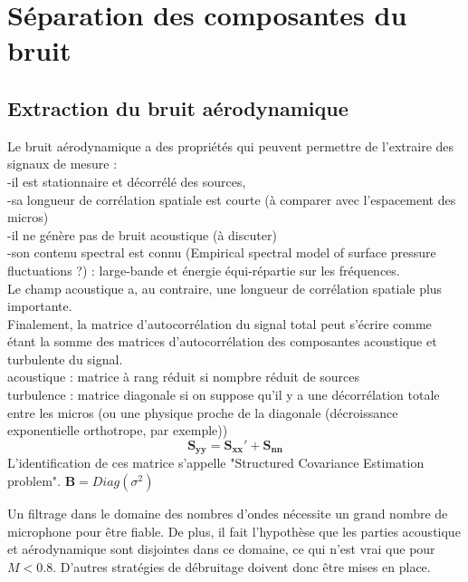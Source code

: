 \chapter{Séparation des composantes du bruit}

\section{Extraction du bruit aérodynamique}

Le bruit aérodynamique a des propriétés qui peuvent permettre de l'extraire des signaux de mesure : \\
-il est stationnaire et décorrélé des sources,\\
-sa longueur de corrélation spatiale est courte (à comparer avec l'espacement des micros) \\
-il ne génère pas de bruit acoustique (à discuter)\\
-son contenu spectral est connu (Empirical spectral model of surface pressure fluctuations ?) : large-bande et énergie équi-répartie sur les fréquences.\\

Le champ acoustique a, au contraire, une longueur de corrélation spatiale plus importante.\\

Finalement, la matrice d'autocorrélation du signal total peut s'écrire comme étant la somme des matrices d'autocorrélation des composantes acoustique et turbulente du signal. \\

acoustique : matrice à rang réduit si  nompbre réduit de sources\\
turbulence : matrice diagonale si on suppose qu'il y a une décorrélation totale entre les micros (ou une physique proche de la diagonale (décroissance exponentielle orthotrope, par exemple))\\

\begin{equation}
\bm{S_{yy}} = \bm{S_{xx}}' + \bm{S_{nn}}
\end{equation}
L'identification de ces matrice s'appelle "Structured Covariance Estimation problem".
$\bm{B}=Diag(\sigma^{2})$

Un filtrage dans le domaine des nombres d'ondes nécessite un grand nombre de microphone pour être fiable. De plus, il fait l'hypothèse que les parties acoustique et aérodynamique sont disjointes dans ce domaine, ce qui n'est vrai que pour $M<0.8$. D'autres stratégies de débruitage doivent donc être mises en place.


